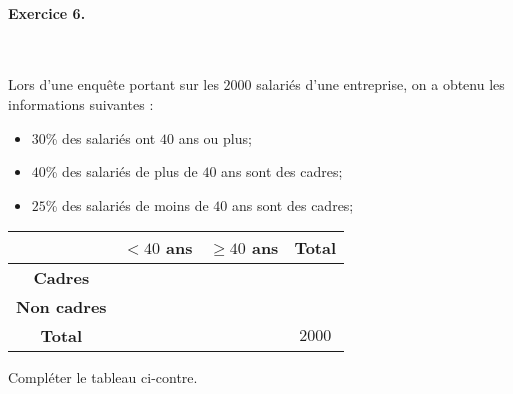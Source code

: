 \documentclass[11pt]{article}
\begin{document}
\paragraph{Exercice 6.}~\\
\begin{minipage}{.5\textwidth}
  Lors d'une enquête portant sur les $2000$ salariés d'une entreprise, on a
  obtenu les informations suivantes :
\begin{itemize}
  \item $30$\% des salariés ont $40$ ans ou plus;
  \item $40$\% des salariés de plus de $40$ ans sont des cadres;
  \item $25$\% des salariés de moins de $40$ ans sont des cadres;
\end{itemize}
\end{minipage}
\begin{minipage}{.5\textwidth}
  \begin{center}
    \def\arraystretch{1.75}
 \begin{tabular}{|c|c|c|c|}
   \hline
  & \textbf{$<40$ ans} & \textbf{$\geq40$ ans} & \textbf{Total} \\
   \hline
  \textbf{Cadres} &  &  &  \\
   \hline
  \textbf{Non cadres} &  &  &  \\
   \hline
  \textbf{Total} &  & & $2000$ \\
   \hline
\end{tabular}
  \end{center}
\end{minipage}
Compléter le tableau ci-contre.
\end{document}
